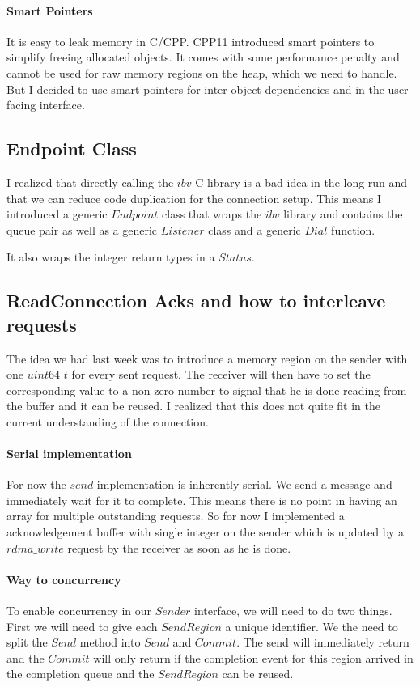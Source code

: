 \documentclass[a4paper,twoside]{article} %
\begin{document}
\paragraph{Smart Pointers} It is easy to leak memory in C/CPP. CPP11 introduced smart pointers to simplify freeing allocated 
objects. It comes with some performance penalty and cannot be used for raw memory regions on the heap, which we need to handle.
But I decided to use smart pointers for inter object dependencies and in the user facing interface.

\subsection*{Endpoint Class}

I realized that directly calling the $ibv$ C library is a bad idea in the long run and that we can reduce code duplication 
for the connection setup. This means I introduced a generic $Endpoint$ class that wraps the $ibv$ library and contains the 
queue pair as well as a generic $Listener$ class and a generic $Dial$ function.

It also wraps the integer return types in a $Status$.


\subsection*{ReadConnection Acks and how to interleave requests}

The idea we had last week was to introduce a memory region on the sender with one $uint64\_t$ for every sent request. The 
receiver will then have to set the corresponding value to a non zero number to signal that he is done reading from the buffer
and it can be reused. I realized that this does not quite fit in the current understanding of the connection.

\paragraph{Serial implementation} For now the $send$ implementation is inherently serial. We send a message and immediately 
wait for it to complete. This means there is no point in having an array for multiple outstanding requests. So for now I 
implemented a acknowledgement buffer with single integer on the sender which is updated by a $rdma\_write$ request by the 
receiver as soon as he is done.

\paragraph{Way to concurrency} To enable concurrency in our $Sender$ interface, we will need to do two things. First we will
need to give each $SendRegion$ a unique identifier. We the need to split the $Send$ method into $Send$ and $Commit$. The 
send will immediately return and the $Commit$ will only return if the completion event for this region arrived in the 
completion queue and the $SendRegion$ can be reused. 
\end{document}
